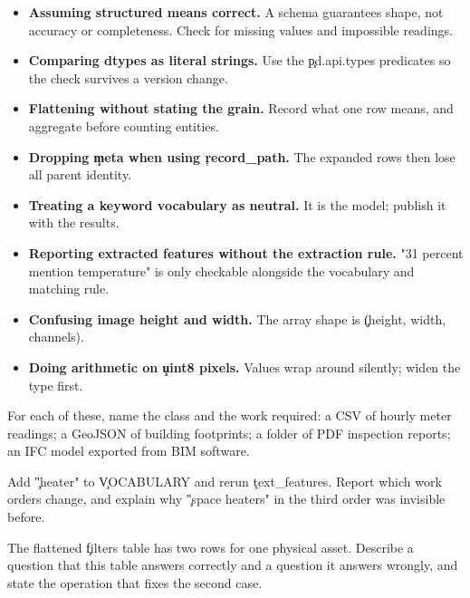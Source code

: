 \begin{itemize}
    \item \textbf{Assuming structured means correct.} A schema guarantees shape,
          not accuracy or completeness. Check for missing values and impossible
          readings.
    \item \textbf{Comparing dtypes as literal strings.} Use the
          \c{pd.api.types} predicates so the check survives a version change.
    \item \textbf{Flattening without stating the grain.} Record what one row
          means, and aggregate before counting entities.
    \item \textbf{Dropping \c{meta} when using \c{record_path}.} The expanded
          rows then lose all parent identity.
    \item \textbf{Treating a keyword vocabulary as neutral.} It is the model;
          publish it with the results.
    \item \textbf{Reporting extracted features without the extraction rule.}
          "31 percent mention temperature" is only checkable alongside the
          vocabulary and matching rule.
    \item \textbf{Confusing image height and width.} The array shape is
          \c{(height, width, channels)}.
    \item \textbf{Doing arithmetic on \c{uint8} pixels.} Values wrap around
          silently; widen the type first.
\end{itemize}



For each of these, name the class and the work required: a CSV of hourly meter
readings; a GeoJSON of building footprints; a folder of PDF inspection reports;
an IFC model exported from BIM software.


Add \c{"heater"} to \c{VOCABULARY} and rerun \c{text_features}. Report which
work orders change, and explain why \c{"space heaters"} in the third order was
invisible before.


The flattened \c{filters} table has two rows for one physical asset. Describe a
question that this table answers correctly and a question it answers wrongly,
and state the operation that fixes the second case.


